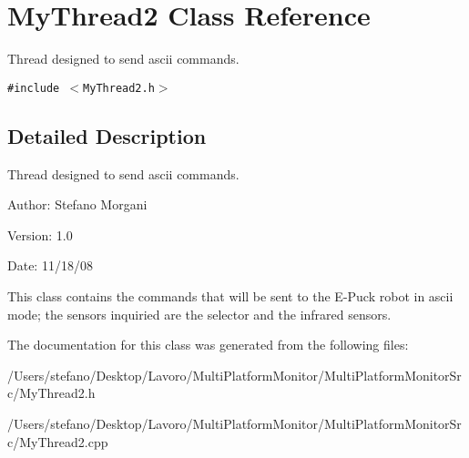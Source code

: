 \section{MyThread2 Class Reference}
\label{class_my_thread2}
Thread designed to send ascii commands.  


{\tt \#include $<$MyThread2.h$>$}



\subsection{Detailed Description}
Thread designed to send ascii commands. 

\begin{Desc}
\item[Author:]Stefano Morgani \end{Desc}
\begin{Desc}
\item[Version:]1.0 \end{Desc}
\begin{Desc}
\item[Date:]11/18/08\end{Desc}
This class contains the commands that will be sent to the E-Puck robot in ascii mode; the sensors inquiried are the selector and the infrared sensors. 

The documentation for this class was generated from the following files:\begin{CompactItemize}
\item 
/Users/stefano/Desktop/Lavoro/MultiPlatformMonitor/MultiPlatformMonitorSrc/MyThread2.h\item 
/Users/stefano/Desktop/Lavoro/MultiPlatformMonitor/MultiPlatformMonitorSrc/MyThread2.cpp\end{CompactItemize}
